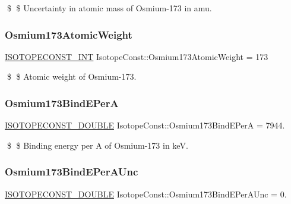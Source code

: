 \$ \$ Uncertainty in atomic mass of Osmium-\/173 in amu. \mbox{\label{group___isotope_const-_osmium-_os173_ga56970c652db4fbc6ed8ee95caa9b4833}} 
\subsubsection{\texorpdfstring{Osmium173\+Atomic\+Weight}{Osmium173AtomicWeight}}
{\footnotesize\ttfamily \mbox{\hyperlink{group___isotope_const-_macros_ga5f18360b3e99483a35c32d789e62621c}{I\+S\+O\+T\+O\+P\+E\+C\+O\+N\+S\+T\+\_\+\+I\+NT}} Isotope\+Const\+::\+Osmium173\+Atomic\+Weight = 173}

\$ \$ Atomic weight of Osmium-\/173. \mbox{\label{group___isotope_const-_osmium-_os173_ga72ab0845d738e32511a14061c8e32522}} 
\subsubsection{\texorpdfstring{Osmium173\+Bind\+E\+PerA}{Osmium173BindEPerA}}
{\footnotesize\ttfamily \mbox{\hyperlink{group___isotope_const-_macros_ga8f45a7272ce02c0b4c65c44636ed719a}{I\+S\+O\+T\+O\+P\+E\+C\+O\+N\+S\+T\+\_\+\+D\+O\+U\+B\+LE}} Isotope\+Const\+::\+Osmium173\+Bind\+E\+PerA = 7944.}

\$ \$ Binding energy per A of Osmium-\/173 in keV. \mbox{\label{group___isotope_const-_osmium-_os173_ga1e514e87e646973a1707828df7705d76}} 
\subsubsection{\texorpdfstring{Osmium173\+Bind\+E\+Per\+A\+Unc}{Osmium173BindEPerAUnc}}
{\footnotesize\ttfamily \mbox{\hyperlink{group___isotope_const-_macros_ga8f45a7272ce02c0b4c65c44636ed719a}{I\+S\+O\+T\+O\+P\+E\+C\+O\+N\+S\+T\+\_\+\+D\+O\+U\+B\+LE}} Isotope\+Const\+::\+Osmium173\+Bind\+E\+Per\+A\+Unc = 0.}

